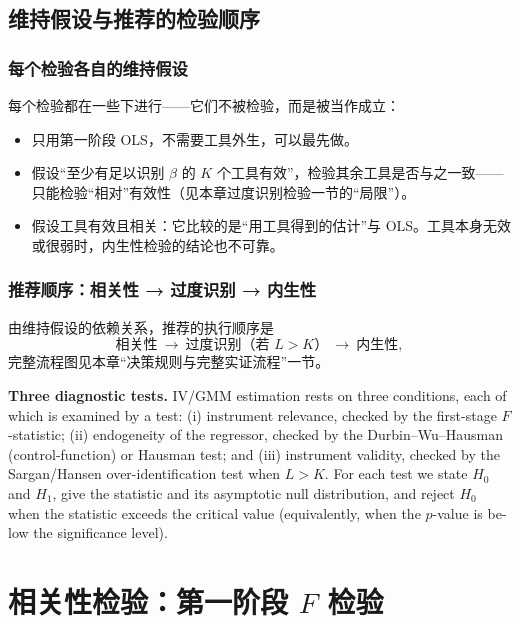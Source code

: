 \subsection{维持假设与推荐的检验顺序}

\subsubsection{每个检验各自的维持假设}

每个检验都在一些下进行——它们不被检验，而是被当作成立：
\begin{itemize}
  \item {}只用第一阶段 OLS，不需要工具外生，可以最先做。
  \item {}假设“至少有足以识别 $\beta$ 的 $K$ 个工具有效”，检验其余工具是否与之一致——只能检验“相对”有效性（见本章过度识别检验一节的“局限”）。
  \item {}假设工具有效且相关：它比较的是“用工具得到的估计”与 OLS。工具本身无效或很弱时，内生性检验的结论也不可靠。
\end{itemize}

\subsubsection{推荐顺序：相关性 → 过度识别 → 内生性}

由维持假设的依赖关系，推荐的执行顺序是
\[
\text{相关性}\ \longrightarrow\ \text{过度识别（若 }L>K\text{）}\ \longrightarrow\ \text{内生性},
\]
完整流程图见本章“决策规则与完整实证流程”一节。

\begin{english}
\textbf{Three diagnostic tests.} IV/GMM estimation rests on three conditions, each of which is examined by a test: (i) instrument relevance, checked by the first-stage $F$-statistic; (ii) endogeneity of the regressor, checked by the Durbin--Wu--Hausman (control-function) or Hausman test; and (iii) instrument validity, checked by the Sargan/Hansen over-identification test when $L>K$. For each test we state $H_0$ and $H_1$, give the statistic and its asymptotic null distribution, and reject $H_0$ when the statistic exceeds the critical value (equivalently, when the $p$-value is below the significance level).
\end{english}

\section{相关性检验：第一阶段 \texorpdfstring{$F$}{F} 检验}\label{sec:U09-relevance}

